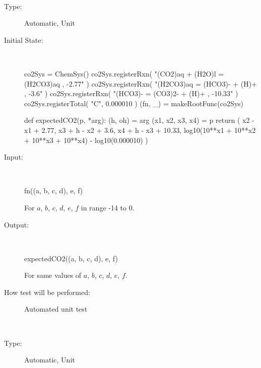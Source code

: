 \documentclass[12pt, titlepage]{article}
\newcounter{testnum} %
\begin{document}
\begin{addmargin}[2em]{0em}

\\
\begin{addmargin}[2em]{0em}
\begin{description}
\item[Type:] Automatic, Unit
					
\item[Initial State:] ~\newline

\begin{python}
co2Sys = ChemSys()
co2Sys.registerRxn(
  "(CO2)aq + (H2O)l = (H2CO3)aq , -2.77"
)
co2Sys.registerRxn(
  "(H2CO3)aq = (HCO3)- + (H)+ , -3.6"
)
co2Sys.registerRxn(
  "(HCO3)- = (CO3)2- + (H)+ , -10.33"
)
co2Sys.registerTotal(
  "C", 0.000010
)
(fn, _) = makeRootFunc(co2Sys)

def expectedCO2(p, *arg):
  (h, oh) = arg
  (x1, x2, x3, x4) = p
  return ( x2 - x1 + 2.77, 
           x3 + h - x2 + 3.6,
           x4 + h - x3 + 10.33,
           log10(10**x1 + 10**x2 + 10**x3 + 10**x4) 
             - log10(0.000010) )
\end{python}
					
\item[Input:] ~\newline

\begin{python}
fn((a, b, c, d), e, f)
\end{python}

For $a$, $b$, $c$, $d$, $e$, $f$ in range -14 to 0.
					
\item[Output:] ~\newline

\begin{python}
expectedCO2((a, b, c, d), e, f)
\end{python}

For same values of $a$, $b$, $c$, $d$, $e$, $f$.
					
\item[How test will be performed:] Automated unit test\\
\end{description}
\end{addmargin}



\\
\begin{addmargin}[2em]{0em}
\begin{description}
\item[Type:] Automatic, Unit
					

\end{description}
\end{addmargin}
\end{addmargin}
\end{document}
